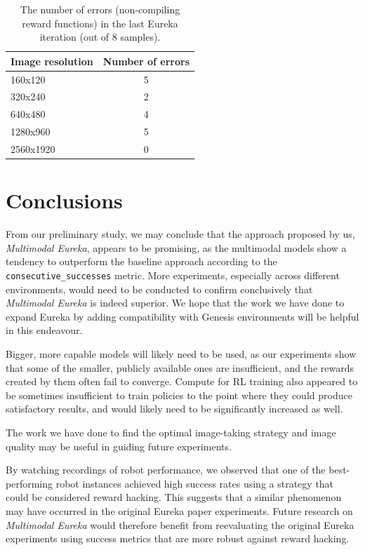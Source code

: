 \documentclass[10pt,twocolumn]{article}
\begin{document}
\begin{table}
    \centering
    \begin{tabular}{|l|c|}
        \hline
        Image resolution               & Number of errors \\
        \hline
        160x120                   & 5   \\
        320x240                   & 2   \\
        640x480                   & 4   \\
        1280x960                  & 5   \\
        2560x1920                 & 0   \\
        \hline
    \end{tabular}
    \caption{The number of errors (non-compiling reward functions) in the last Eureka iteration (out of 8 samples).}
    \label{tab:image_quality_errors}
\end{table}

\section{Conclusions}

From our preliminary study, we may conclude that the approach proposed by us, \textit{Multimodal Eureka}, appears to be promising, as the multimodal models show a tendency to outperform the baseline approach according to the \verb|consecutive_successes| metric. More experiments, especially across different environments, would need to be conducted to confirm conclusively that \textit{Multimodal Eureka} is indeed superior. We hope that the work we have done to expand Eureka by adding compatibility with Genesis environments will be helpful in this endeavour.

Bigger, more capable models will likely need to be used, as our experiments show that some of the smaller, publicly available ones are insufficient, and the rewards created by them often fail to converge. Compute for RL training also appeared to be sometimes insufficient to train policies to the point where they could produce satisfactory results, and would likely need to be significantly increased as well.

The work we have done to find the optimal image-taking strategy and image quality may be useful in guiding future experiments.

By watching recordings of robot performance, we observed that one of the best-performing robot instances achieved high success rates using a strategy that could be considered reward hacking. This suggests that a similar phenomenon may have occurred in the original Eureka paper experiments. Future research on \textit{Multimodal Eureka} would therefore benefit from reevaluating the original Eureka experiments using success metrics that are more robust against reward hacking.
\end{document}
